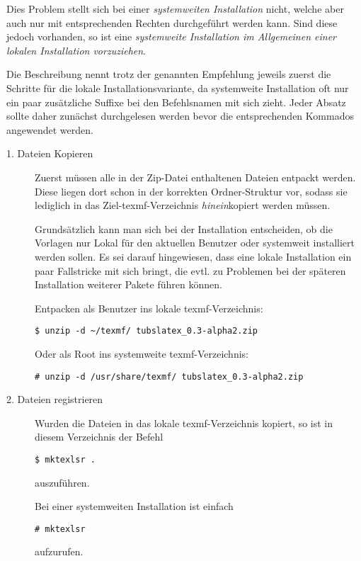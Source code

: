 Dies Problem stellt sich bei einer \emph{systemweiten Installation} nicht,
welche aber auch nur mit entsprechenden Rechten durchgeführt werden kann.
Sind diese jedoch vorhanden, so ist eine \emph{systemweite Installation im
Allgemeinen einer lokalen Installation vorzuziehen}.

\begin{important}
Die Beschreibung nennt trotz der genannten Empfehlung jeweils zuerst die
Schritte für die lokale Installationsvariante, da systemweite Installation
oft nur ein paar zusätzliche Suffixe bei den Befehlsnamen mit sich zieht.
Jeder Absatz sollte daher zunächst durchgelesen werden bevor die entsprechenden
Kommados angewendet werden.
\end{important}


\begin{description}
  \item[1. Dateien Kopieren] Zuerst müssen alle in der Zip-Datei enthaltenen
    Dateien entpackt werden.
    Diese liegen dort schon in der korrekten Ordner-Struktur vor, sodass
    sie lediglich in das Ziel-texmf-Verzeichnis \emph{hinein}kopiert werden
    müssen.
    
    Grundsätzlich kann man sich bei der Installation entscheiden,
    ob die Vorlagen nur Lokal für den aktuellen Benutzer oder systemweit
    installiert werden sollen.
    Es sei darauf hingewiesen, dass eine lokale Installation ein paar
    Fallstricke mit sich bringt, die evtl. zu Problemen bei der späteren
    Installation weiterer Pakete führen können.
    
    Entpacken als Benutzer ins lokale texmf-Verzeichnis:
    \begin{lstlisting}
$ unzip -d ~/texmf/ tubslatex_0.3-alpha2.zip
    \end{lstlisting}
    Oder als Root ins systemweite texmf-Verzeichnis:
    \begin{lstlisting}
# unzip -d /usr/share/texmf/ tubslatex_0.3-alpha2.zip
    \end{lstlisting}
  \item[2. Dateien registrieren]
    Wurden die Dateien in das lokale texmf-Verzeichnis kopiert, so ist
    in diesem Verzeichnis der Befehl
    \begin{lstlisting}
$ mktexlsr .
    \end{lstlisting}
    auszuführen.

    Bei einer systemweiten Installation ist einfach
    \begin{lstlisting}
# mktexlsr
    \end{lstlisting}
    aufzurufen.


\end{description}
